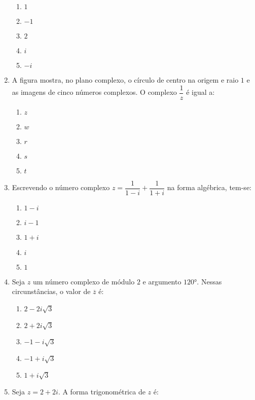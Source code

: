 \documentclass[11pt,a4paper]{article}
\begin{document}
\begin{enumerate}
\begin{enumerate}
	\item $1$
	\item $-1$ %
	\item $2$
	\item $i$
	\item $-i$
\end{enumerate}
\item A figura mostra, no plano complexo, o círculo de centro na origem e raio $1$ e as imagens de cinco números complexos. O complexo $\dfrac{1}{z}$ é igual a:
	\begin{center}
	\end{center}

\begin{enumerate}
	\item $z$
	\item $w$
	\item $r$
	\item $s$
	\item $t$ %
\end{enumerate}
\item Escrevendo o número complexo $z=\dfrac{1}{1-i} + \dfrac{1}{1+i}$ na forma algébrica, tem-se:

\begin{enumerate}
	\item $1-i$
	\item $i-1$
	\item $1+i$
	\item $i$
	\item $1$ %
\end{enumerate}
\item Seja $z$ um número complexo de módulo $2$ e argumento $120°$. Nessas circunstâncias, o valor de $\overline{z}$ é:

\begin{enumerate}
	\item $2-2i\sqrt{3}$
	\item $2+2i\sqrt{3}$
	\item $-1-i\sqrt{3}$ %
	\item $-1+i\sqrt{3}$
	\item $1+i\sqrt{3}$
\end{enumerate}
\item Seja $z=2+2i$. A forma trigonométrica de $z$ é:


\end{enumerate}
\end{document}

